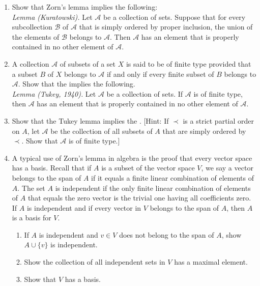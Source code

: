 \begin{enumerate}[itemsep=0.4em, parsep=0pt, topsep=0pt, partopsep=0pt, leftmargin=*, label=\arabic*., ref=\arabic*]
\item Show that Zorn's lemma implies the following: \\ \textsl{Lemma (Kuratowski).} Let \(\mathcal{A}\) be a collection of sets. Suppose that for every subcollection \(\mathcal{B}\) of \(\mathcal{A}\) that is simply ordered by proper inclusion, the union of the elements of \(\mathcal{B}\) belongs to \(\mathcal{A}\). Then \(\mathcal{A}\) has an element that is properly contained in no other element of \(\mathcal{A}\).
\item A collection \(\mathcal{A}\) of subsets of a set \(X\) is said to be of finite type provided that a subset \(B\) of \(X\) belongs to \(\mathcal{A}\) if and only if every finite subset of \(B\) belongs to \(\mathcal{A}\). Show that the  implies the following. \\ \textsl{Lemma (Tukey, 1940).} Let \(\mathcal{A}\) be a collection of sets. If \(\mathcal{A}\) is of finite type, then \(\mathcal{A}\) has an element that is properly contained in no other element of \(\mathcal{A}\).
\item Show that the Tukey lemma implies the . [Hint: If \(\prec\) is a strict partial order on \(A\), let \(\mathcal{A}\) be the collection of all subsets of \(A\) that are simply ordered by \(\prec\). Show that \(\mathcal{A}\) is of finite type.]
\item A typical use of Zorn's lemma in algebra is the proof that every vector space has a basis. Recall that if \(A\) is a subset of the vector space \(V\), we say a vector belongs to the span of \(A\) if it equals a finite linear combination of elements of \(A\). The set \(A\) is independent if the only finite linear combination of elements of \(A\) that equals the zero vector is the trivial one having all coefficients zero. If \(A\) is independent and if every vector in \(V\) belongs to the span of \(A\), then \(A\) is a basis for \(V\).
  \begin{enumerate}[itemsep=0.2em, parsep=0pt, topsep=0pt, partopsep=0pt, leftmargin=*, label=(\alph*), align=left]
  \item If \(A\) is independent and \(v \in V\) does not belong to the span of \(A\), show \(A \cup \{ v\}\) is independent.
  \item Show the collection of all independent sets in \(V\) has a maximal element.
  \item Show that \(V\) has a basis.
  \end{enumerate}
\end{enumerate}

